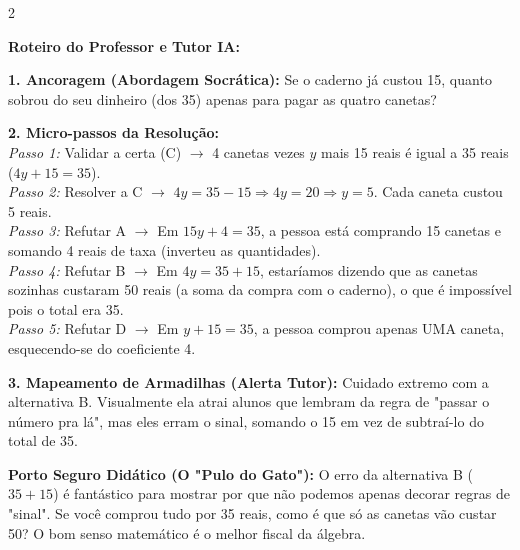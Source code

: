 \begin{multicols*}{2}
\ifgabarito
    \begin{tcolorbox}[colback=CorTitUm!5, colframe=CorTitUm, boxrule=1pt, arc=4pt, left=6pt, right=6pt, top=6pt, bottom=6pt]
    \small\textbf{\textcolor{CorTitUm}{Roteiro do Professor e Tutor IA:}}\par\vspace{0.1cm}
    \color{CinzaEscuro}
    \textbf{1. Ancoragem (Abordagem Socrática):} Se o caderno já custou 15, quanto sobrou do seu dinheiro (dos 35) apenas para pagar as quatro canetas?\par\vspace{0.1cm}
    
    \textbf{2. Micro-passos da Resolução:}\\
    \textit{Passo 1:} Validar a certa (C) $\rightarrow$ 4 canetas vezes $y$ mais 15 reais é igual a 35 reais ($4y + 15 = 35$).\\
    \textit{Passo 2:} Resolver a C $\rightarrow$ $ 4y = 35 - 15 \Rightarrow 4y = 20 \Rightarrow y = 5 $. Cada caneta custou 5 reais.\\
    \textit{Passo 3:} Refutar A $\rightarrow$ Em $15y + 4 = 35$, a pessoa está comprando 15 canetas e somando 4 reais de taxa (inverteu as quantidades).\\
    \textit{Passo 4:} Refutar B $\rightarrow$ Em $4y = 35 + 15$, estaríamos dizendo que as canetas sozinhas custaram 50 reais (a soma da compra com o caderno), o que é impossível pois o total era 35.\\
    \textit{Passo 5:} Refutar D $\rightarrow$ Em $y + 15 = 35$, a pessoa comprou apenas UMA caneta, esquecendo-se do coeficiente 4.\par\vspace{0.1cm}
    
    \textbf{3. Mapeamento de Armadilhas (Alerta Tutor):} Cuidado extremo com a alternativa B. Visualmente ela atrai alunos que lembram da regra de "passar o número pra lá", mas eles erram o sinal, somando o 15 em vez de subtraí-lo do total de 35.
    \end{tcolorbox}
    \vspace{0.15cm}
    
    \begin{boxexplicacao}
    \textbf{Porto Seguro Didático (O "Pulo do Gato"):} O erro da alternativa B ($35+15$) é fantástico para mostrar por que não podemos apenas decorar regras de "sinal". Se você comprou tudo por 35 reais, como é que só as canetas vão custar 50? O bom senso matemático é o melhor fiscal da álgebra.
    \end{boxexplicacao}
\fi


\end{multicols*}
